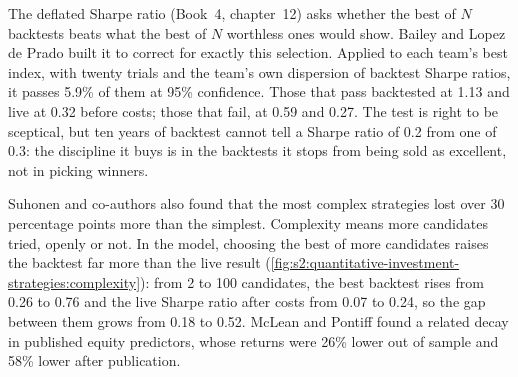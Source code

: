 The deflated Sharpe ratio (Book~4, chapter~12) asks whether the best of $N$ backtests beats what the best of $N$ worthless ones would show. Bailey and
Lopez de Prado built it to correct for exactly this selection. Applied to each team's best index, with twenty trials and the team's own dispersion of
backtest Sharpe ratios, it passes 5.9\% of them at 95\% confidence. Those that pass backtested at 1.13 and live at 0.32 before costs; those that fail,
at 0.59 and 0.27. The test is right to be sceptical, but ten years of backtest cannot tell a Sharpe ratio of 0.2 from one of 0.3: the discipline it buys
is in the backtests it stops from being sold as excellent, not in picking winners.

Suhonen and co-authors also found that the most complex strategies lost over 30 percentage points more than the simplest. Complexity means more
candidates tried, openly or not. In the model, choosing the best of more candidates raises the backtest far more than the live result
(\cref{fig:s2:quantitative-investment-strategies:complexity}): from 2 to 100 candidates, the best backtest rises from 0.26 to 0.76 and the live Sharpe
ratio after costs from 0.07 to 0.24, so the gap between them grows from 0.18 to 0.52. McLean and Pontiff found a related decay in published equity
predictors, whose returns were 26\% lower out of sample and 58\% lower after publication.

\begin{omfigure}

\label{fig:s2:quantitative-investment-strategies:complexity}
\end{omfigure}

